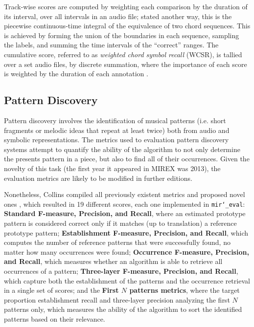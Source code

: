 \documentclass{article}
\def\mireval{\texttt{mir\char`_eval}}
\begin{document}
Track-wise scores are computed by weighting each comparison by the duration of its interval, over all intervals in an audio file; stated another way, this is the piecewise continuous-time integral of the equivalence of two chord sequences.
This is achieved by forming the union of the boundaries in each sequence, sampling the labels, and summing the time intervals of the ``correct'' ranges. 
The cumulative score, referred to as \emph{weighted chord symbol recall} (WCSR), is tallied over a set audio files, by discrete summation, where the importance of each score is weighted by the duration of each annotation \cite{choi2013mirex}.
 
\subsection{Pattern Discovery}

Pattern discovery involves the identification of musical patterns (i.e. short fragments or melodic ideas that repeat at least twice) both from audio and symbolic representations.
The metrics used to evaluation pattern discovery systems attempt to quantify the ability of the algorithm to not only determine the presents pattern in a piece, but also to find all of their occurrences.
Given the novelty of this task (the first year it appeared in MIREX was 2013), the evaluation metrics are likely to be modified in further editions.

Nonetheless, Collins compiled all previously existent metrics and proposed novel ones \cite{Collins2013}, which resulted in 19 different scores, each one implemented in \mireval{}:
\textbf{Standard F-measure, Precision, and Recall}, where an estimated prototype pattern is considered correct only if it matches (up to translation) a reference prototype pattern;
\textbf{Establishment F-measure, Precision, and Recall}, which computes the number of reference patterns that were successfully found, no matter how many occurrences were found;
\textbf{Occurrence F-measure, Precision, and Recall}, which measures whether an algorithm is able to retrieve all occurrences of a pattern;
\textbf{Three-layer F-measure, Precision, and Recall}, which capture both the establishment of the patterns and the occurrence retrieval in a single set of scores;
and the \textbf{First $N$ patterns metrics}, where the target proportion establishment recall and three-layer precision analyzing the first $N$ patterns only, which measures the ability of the algorithm to sort the identified patterns based on their relevance. 
\end{document}
